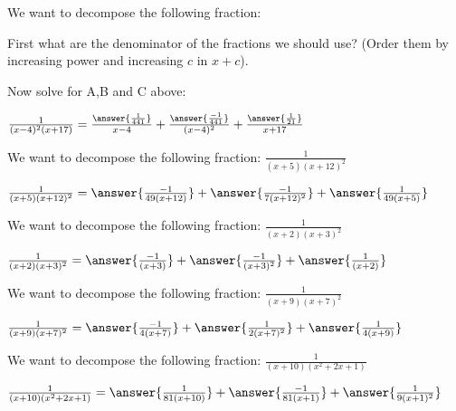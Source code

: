 \documentclass{ximera}
\author{Nicholas Hemleben}
\begin{document}



\begin{exercise}
We want to decompose the following fraction: 

First what are the denominator of the fractions we should use?
(Order them by increasing power and increasing $c$ in $x+c$).


\begin{exercise}
Now solve for A,B and C above:

$
\frac{1}{(x-4)^2(x+17)} =
 \frac{\answer{\frac{1}{441}}}{{x-4}} + 
\frac{\answer{\frac{-1}{441}}}{{(x-4)^2}} +
 \frac{\answer{\frac{1}{21}}}{{x+17}}
$
\end{exercise}


\end{exercise}




\begin{exercise}


We want to decompose the following fraction: 
$\frac{1}{(x+5)(x+12)^2} $

$
\frac{1}{(x+5)(x+12)^2} =
 \answer{\frac{-1}{49(x+12)}} +
\answer{\frac{-1}{7(x+12)^2}} + 
\answer{\frac{1}{49(x+5)}}
$
\end{exercise}


\begin{exercise}


We want to decompose the following fraction: 
$\frac{1}{(x+2)(x+3)^2} $

$
\frac{1}{(x+2)(x+3)^2} =
 \answer{\frac{-1}{(x+3)}} +
\answer{\frac{-1}{(x+3)^2}} + 
\answer{\frac{1}{(x+2)}}
$


\end{exercise}


\begin{exercise}
We want to decompose the following fraction: 
$\frac{1}{(x+9)(x+7)^2} $

$
\frac{1}{(x+9)(x+7)^2} =
 \answer{\frac{-1}{4(x+7)}} +
\answer{\frac{1}{2(x+7)^2}} + 
\answer{\frac{1}{4(x+9)}}
$
\end{exercise}







\begin{exercise}


We want to decompose the following fraction: 
$\frac{1}{(x+10)(x^2+2x+1)} $

$
\frac{1}{(x+10)(x^2+2x+1)} =
 \answer{\frac{1}{81(x+10)}} +
\answer{\frac{-1}{81(x+1)}} + 
\answer{\frac{1}{9(x+1)^2}}
$


\end{exercise}
\end{document}
